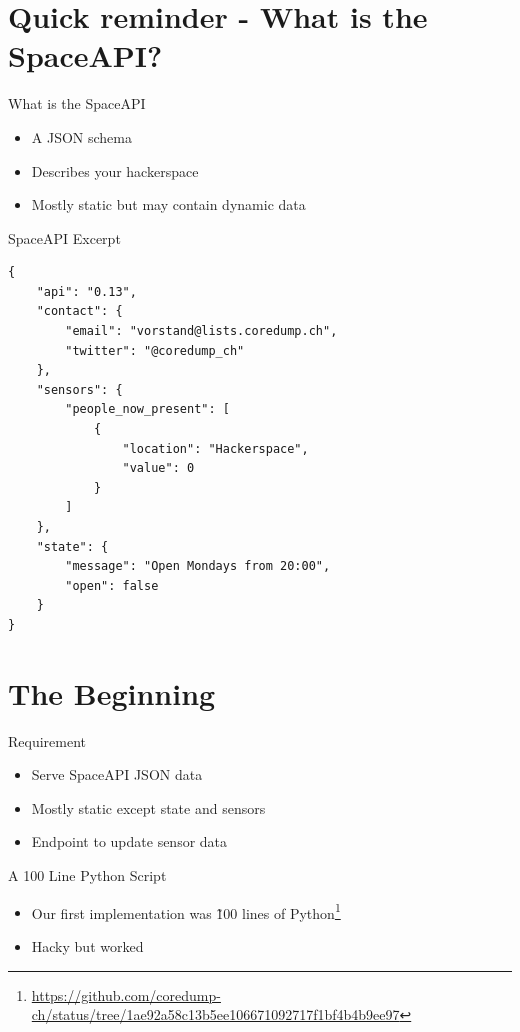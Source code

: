 \section{Quick reminder - What is the SpaceAPI?}

\begin{frame}[c]{What is the SpaceAPI}
    \begin{itemize}
        \item A JSON schema
        \item Describes your hackerspace
        \item Mostly static but may contain dynamic data
    \end{itemize}
\end{frame}

\begin{frame}[fragile]{SpaceAPI Excerpt}
    \begin{verbatim}
{
    "api": "0.13",
    "contact": {
        "email": "vorstand@lists.coredump.ch",
        "twitter": "@coredump_ch"
    },
    "sensors": {
        "people_now_present": [
            {
                "location": "Hackerspace",
                "value": 0
            }
        ]
    },
    "state": {
        "message": "Open Mondays from 20:00",
        "open": false
    }
}
    \end{verbatim}
\end{frame}

\section{The Beginning}

\begin{frame}[c]{Requirement}
    \begin{itemize}
        \item Serve SpaceAPI JSON data
        \item Mostly static except state and sensors
        \item Endpoint to update sensor data
    \end{itemize}
\end{frame}

\begin{frame}[c]{A 100 Line Python Script}
    \begin{itemize}
        \item Our first implementation was \~100 lines of Python\footnote{\url{https://github.com/coredump-ch/status/tree/1ae92a58c13b5ee106671092717f1bf4b4b9ee97}}
        \item Hacky but worked
    \end{itemize}
\end{frame}

